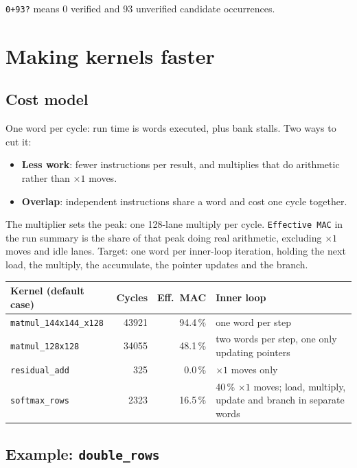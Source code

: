 \documentclass[11pt,a4paper]{article}
\begin{document}
\texttt{0+93?} means 0 verified and 93 unverified candidate occurrences.

\section{Making kernels faster}\label{sec:fast}

\subsection{Cost model}

One word per cycle: run time is words executed, plus bank stalls. Two ways to
cut it:

\begin{itemize}
\item \textbf{Less work}: fewer instructions per result, and multiplies that do
  arithmetic rather than $\times 1$ moves.
\item \textbf{Overlap}: independent instructions share a word and cost one
  cycle together.
\end{itemize}

The multiplier sets the peak: one 128-lane multiply per cycle.
\texttt{Effective MAC} in the run summary is the share of that peak doing real
arithmetic, excluding $\times 1$ moves and idle lanes. Target: one word per
inner-loop iteration, holding the next load, the multiply, the accumulate, the
pointer updates and the branch.

\begin{center}
\small
\begin{tabularx}{\linewidth}{lrrX}
\toprule
Kernel (default case) & Cycles & Eff.\ MAC & Inner loop \\
\midrule
\texttt{matmul\_144x144\_x128} & 43921 & 94.4\,\% & one word per step \\
\texttt{matmul\_128x128} & 34055 & 48.1\,\% & two words per step, one only
updating pointers \\
\texttt{residual\_add} & 325 & 0.0\,\% & $\times 1$ moves only \\
\texttt{softmax\_rows} & 2323 & 16.5\,\% & 40\,\% $\times 1$ moves;
load, multiply, update and branch in separate words \\
\bottomrule
\end{tabularx}
\end{center}

\subsection{Example: \texttt{double\_rows}}\label{sec:onerow}
\end{document}
